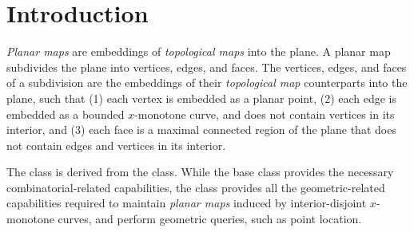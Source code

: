 
\def\Ipe#1{\def\IPEfile{#1}}

\renewcommand{\Re}{{\rm I\!\hspace{-0.025em} R}}

\def\C{{\cal C}}
\def\G{{\cal G}}
\def\F{{\cal F}}
\def\I{{\cal I}}
\def\U{{\cal U}}
\def\M{{\cal M}}
\def\eps{{\varepsilon}}
\def\bd{{\partial}}
\def\dm{{\cal D}}



\section{Introduction}
\label{PM_sec:intro}

{\em Planar maps} are embeddings of {\em topological maps} into the
plane. A planar map subdivides the plane into vertices, edges, and
faces. The vertices, edges, and faces of a subdivision are the
embeddings of their {\em topological map} counterparts into the plane,
such that (1) each vertex is embedded as a planar point, (2) each edge
is embedded as a bounded $x$-monotone curve, and does not contain
vertices in its interior, and (3) each face is a maximal connected
region of the plane that does not contain edges and vertices in its
interior.

The  class is derived from the
 class. While the
 base class provides the necessary
combinatorial-related capabilities, the
 class provides all the
geometric-related capabilities required to maintain {\em planar maps}
induced by interior-disjoint $x$-monotone curves, and perform
geometric queries, such as point location.

